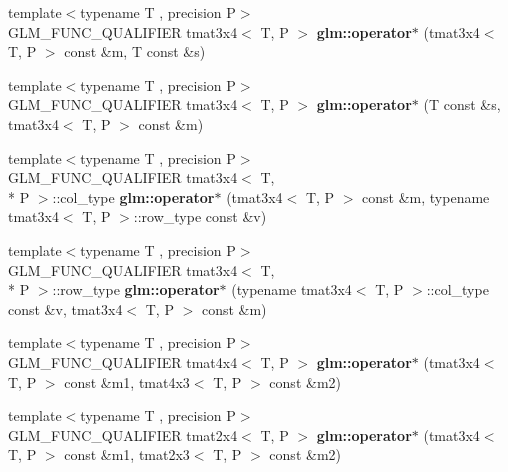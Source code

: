 \begin{DoxyCompactItemize}
\item 
\hypertarget{namespaceglm_aaf5572f712e92e26492087bb211a8c55}{{\footnotesize template$<$typename T , precision P$>$ }\\G\-L\-M\-\_\-\-F\-U\-N\-C\-\_\-\-Q\-U\-A\-L\-I\-F\-I\-E\-R tmat3x4$<$ T, P $>$ {\bfseries glm\-::operator$\ast$} (tmat3x4$<$ T, P $>$ const \&m, T const \&s)}\label{namespaceglm_aaf5572f712e92e26492087bb211a8c55}

\item 
\hypertarget{namespaceglm_a213530885c50991995510cb716206848}{{\footnotesize template$<$typename T , precision P$>$ }\\G\-L\-M\-\_\-\-F\-U\-N\-C\-\_\-\-Q\-U\-A\-L\-I\-F\-I\-E\-R tmat3x4$<$ T, P $>$ {\bfseries glm\-::operator$\ast$} (T const \&s, tmat3x4$<$ T, P $>$ const \&m)}\label{namespaceglm_a213530885c50991995510cb716206848}

\item 
\hypertarget{namespaceglm_acfc37201cc87201be4ee62163b920f60}{{\footnotesize template$<$typename T , precision P$>$ }\\G\-L\-M\-\_\-\-F\-U\-N\-C\-\_\-\-Q\-U\-A\-L\-I\-F\-I\-E\-R tmat3x4$<$ T, \\*
P $>$\-::col\-\_\-type {\bfseries glm\-::operator$\ast$} (tmat3x4$<$ T, P $>$ const \&m, typename tmat3x4$<$ T, P $>$\-::row\-\_\-type const \&v)}\label{namespaceglm_acfc37201cc87201be4ee62163b920f60}

\item 
\hypertarget{namespaceglm_a07073085876a06ecf12abfa2cea3c054}{{\footnotesize template$<$typename T , precision P$>$ }\\G\-L\-M\-\_\-\-F\-U\-N\-C\-\_\-\-Q\-U\-A\-L\-I\-F\-I\-E\-R tmat3x4$<$ T, \\*
P $>$\-::row\-\_\-type {\bfseries glm\-::operator$\ast$} (typename tmat3x4$<$ T, P $>$\-::col\-\_\-type const \&v, tmat3x4$<$ T, P $>$ const \&m)}\label{namespaceglm_a07073085876a06ecf12abfa2cea3c054}

\item 
\hypertarget{namespaceglm_a2e36bbd84745c2cd6dee14d589a152dc}{{\footnotesize template$<$typename T , precision P$>$ }\\G\-L\-M\-\_\-\-F\-U\-N\-C\-\_\-\-Q\-U\-A\-L\-I\-F\-I\-E\-R tmat4x4$<$ T, P $>$ {\bfseries glm\-::operator$\ast$} (tmat3x4$<$ T, P $>$ const \&m1, tmat4x3$<$ T, P $>$ const \&m2)}\label{namespaceglm_a2e36bbd84745c2cd6dee14d589a152dc}

\item 
\hypertarget{namespaceglm_a057892ce2a71e76f21025327e4347f10}{{\footnotesize template$<$typename T , precision P$>$ }\\G\-L\-M\-\_\-\-F\-U\-N\-C\-\_\-\-Q\-U\-A\-L\-I\-F\-I\-E\-R tmat2x4$<$ T, P $>$ {\bfseries glm\-::operator$\ast$} (tmat3x4$<$ T, P $>$ const \&m1, tmat2x3$<$ T, P $>$ const \&m2)}\label{namespaceglm_a057892ce2a71e76f21025327e4347f10}


\end{DoxyCompactItemize}
